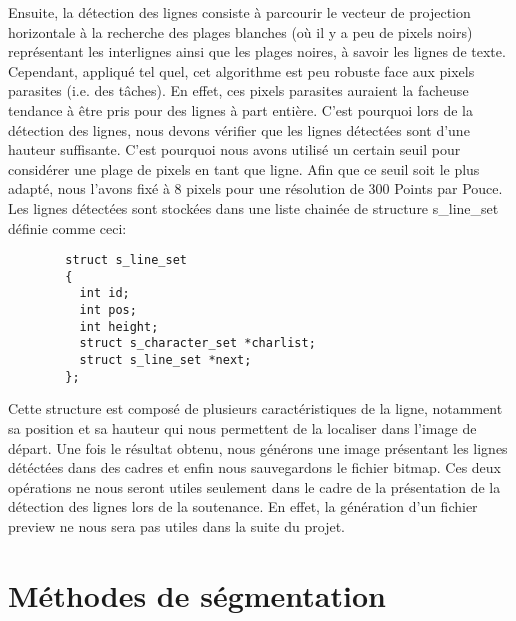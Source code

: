 \documentclass[]{report}
\begin{document}

      Ensuite, la détection des lignes consiste à parcourir le vecteur de projection horizontale à la recherche des plages blanches (où il y a peu de pixels noirs) représentant les interlignes ainsi que les plages noires, à savoir les lignes de texte.
      Cependant, appliqué tel quel, cet algorithme est peu robuste face aux pixels parasites (i.e. des tâches). En effet, ces pixels parasites auraient la facheuse tendance à être pris pour des lignes à part entière. C'est pourquoi lors de la détection des lignes, nous devons vérifier que les lignes détectées sont d'une hauteur suffisante. C'est pourquoi nous avons utilisé un certain seuil pour considérer une plage de pixels en tant que ligne. Afin que ce seuil soit le plus adapté, nous l'avons fixé à 8 pixels pour une résolution de 300 Points par Pouce. Les lignes détectées sont stockées dans une liste chainée de structure s_line_set définie comme ceci:

      \begin{verbatim}
        struct s_line_set
        {
          int id;
          int pos;
          int height;
          struct s_character_set *charlist;
          struct s_line_set *next;
        };
      \end{verbatim}

      Cette structure est composé de plusieurs caractéristiques de la ligne, notamment sa position et sa hauteur qui nous permettent de la localiser dans l'image de départ.
      Une fois le résultat obtenu, nous générons une image présentant les lignes détéctées dans des cadres et enfin nous sauvegardons le fichier bitmap. Ces deux opérations ne nous seront utiles seulement dans le cadre de la présentation de la détection des lignes lors de la soutenance. En effet, la génération d'un fichier preview ne nous sera pas utiles dans la suite du projet.


    \section{M\'ethodes de s\'egmentation} %
    \label{sec:m'ethodes_de_s\'egmentation}




\end{document}
